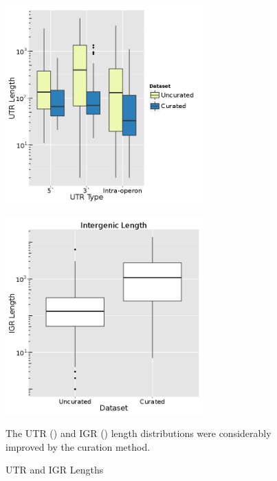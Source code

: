 \begin{figure}
\begin{center}
\begin{minipage}{.48\textwidth}
\begin{center}
{\includegraphics[width=\linewidth,height=3in]{images/Assembly/Curation/PairvsCuration_utrlength.png}
\label{fig:5.21a}}
\end{center}
\end{minipage}
\begin{minipage}{.48\textwidth}
\begin{center}
{\includegraphics[width=\linewidth,height=3in]{images/Assembly/Curation/PairvsCuration_igrlength.png}
\label{fig:5.21b}}
\end{center}
\end{minipage}%
\end{center}
\caption{UTR and IGR Lengths}
The UTR () and IGR () length distributions were considerably improved by the curation method. 
\end{figure}

